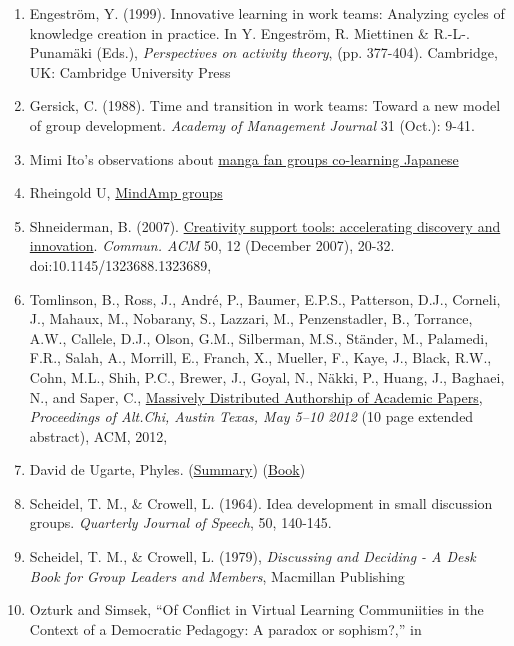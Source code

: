 \begin{enumerate}
\item
  Engeström, Y. (1999). Innovative learning in work teams: Analyzing
  cycles of knowledge creation in practice. In Y. Engeström, R.
  Miettinen \& R.-L-. Punamäki (Eds.), \emph{Perspectives on activity
  theory}, (pp. 377-404). Cambridge, UK: Cambridge University Press
\item
  Gersick, C. (1988). Time and transition in work teams: Toward a new
  model of group development. \emph{Academy of Management Journal} 31
  (Oct.): 9-41.
\item
  Mimi Ito's observations about
  \href{http://mitpress.mit.edu/books/full\_pdfs/hanging\_out.pdf}{manga
  fan groups co-learning Japanese}
\item
  Rheingold U,
  \href{http://socialmediaclassroom.com/host/mindamp5/lockedwiki/main-page}{MindAmp
  groups}
\item
  Shneiderman, B. (2007).
  \href{http://doi.acm.org/10.1145/1323688.1323689}{Creativity support
  tools: accelerating discovery and innovation}. \emph{Commun. ACM} 50,
  12 (December 2007), 20-32. doi:10.1145/1323688.1323689,
\item
  Tomlinson, B., Ross, J., André, P., Baumer, E.P.S., Patterson, D.J.,
  Corneli, J., Mahaux, M., Nobarany, S., Lazzari, M., Penzenstadler, B.,
  Torrance, A.W., Callele, D.J., Olson, G.M., Silberman, M.S., Ständer,
  M., Palamedi, F.R., Salah, A., Morrill, E., Franch, X., Mueller, F.,
  Kaye, J., Black, R.W., Cohn, M.L., Shih, P.C., Brewer, J., Goyal, N.,
  Näkki, P., Huang, J., Baghaei, N., and Saper, C.,
  \href{http://altchi.org/submissions/submission\_wmt\_0.pdf}{Massively
  Distributed Authorship of Academic Papers}, \emph{Proceedings of
  Alt.Chi, Austin Texas, May 5--10 2012} (10 page extended abstract),
  ACM, 2012,
\item
  David de Ugarte, Phyles.
  (\href{http://david.lasindias.com/phyles/}{Summary})
  (\href{http://deugarte.com/gomi/phyles.pdf}{Book})
\item
  Scheidel, T. M., \& Crowell, L. (1964). Idea development in small
  discussion groups. \emph{Quarterly Journal of Speech}, 50, 140-145.
\item
  Scheidel, T. M., \& Crowell, L. (1979), \emph{Discussing and Deciding
  - A Desk Book for Group Leaders and Members}, Macmillan Publishing
\item
  Ozturk and Simsek, ``Of Conflict in Virtual Learning Communiities in
  the Context of a Democratic Pedagogy: A paradox or sophism?,'' in

\end{enumerate}
